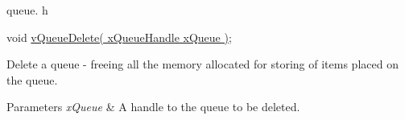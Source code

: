 queue. h 
\begin{DoxyPre}void \hyperlink{win32_2win32_2_libraries_2_free_r_t_o_s_2_source_2queue_8c_a9baffc75681546db871af6aecb346f41}{vQueueDelete( xQueueHandle xQueue )};\end{DoxyPre}


Delete a queue -\/ freeing all the memory allocated for storing of items placed on the queue.


\begin{DoxyParams}{Parameters}
{\em x\-Queue} & A handle to the queue to be deleted. \\
\hline
\end{DoxyParams}
